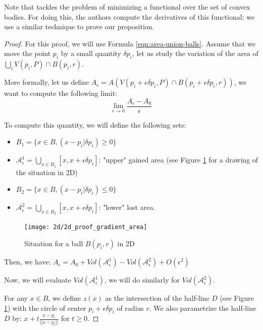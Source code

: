 Note that \cite{lachand2005minimizing} tackles the problem of minimizing a
functional over the set of convex bodies. For doing this, the authors compute the
derivatives of this functional: we use a similar technique to prove our
proposition.

\begin{proof}

For this proof, we will use Formula \ref{eqn:area-union-balls}. Assume that we
move the point $ p_i $ by a small quantity $ \delta p_i $, let us study the
variation of the area of $ \bigcup_i V(p_i, P) \cap B(p_i, r) $.

More formally, let us define $ A_{\epsilon} = A(V(p_i + \epsilon \delta p_i, P) \cap
B(p_i + \epsilon \delta p_i, r)) $, we want to compute the following limit:
$$ \lim\limits_{\epsilon \to 0} \frac{A_{\epsilon} - A_0}{\epsilon} $$

To compute this quantity, we will define the following sets:
\begin{itemize}
    \item $ B_1 = \{ x \in B, (x - p_i | \delta p_i) \geq 0\} $
    \item $ \mathcal{A}^1_{\epsilon} = \bigcup_{x \in B_1} [x, x + \epsilon \delta p_i] $:
        "upper" gained area (see Figure \ref{fig:demo-gradient} for a drawing of the
        situation in 2D)
    \item $ B_2 = \{ x \in B, (x - p_i | \delta p_i) \leq 0\} $
    \item $ \mathcal{A}^2_{\epsilon} = \bigcup_{x \in B_2} [x, x + \epsilon \delta p_i] $:
        "lower" lost area.
\end{itemize}

\begin{figure}[h]
    \centering
    \texttt{[image: 2d/2d\_proof\_gradient\_area]}
    \caption{Situation for a ball $ B(p_i, r) $ in 2D}
    \label{fig:demo-gradient}
\end{figure}

Then, we have: $ A_\epsilon = A_0 + Vol(\mathcal{A}^1_\epsilon) -
Vol(\mathcal{A}^2_\epsilon) + O(\epsilon^2) $

Now, we will evaluate $ Vol(\mathcal{A}^1_\epsilon) $, we will do similarly for $
Vol(\mathcal{A}^2_\epsilon) $.

For any $ x \in B $, we define $ z(x) $ as the intersection of the half-line $ D
$ (see Figure \ref{fig:demo-gradient}) with the circle of center $ p_i +
\epsilon \delta p_i $ of radius $ r $. We also parametrize the half-line $ D $
by: $ x + t \frac{x - p_i}{||x - p_i||} $ for $ t \ge 0 $.


\end{proof}
